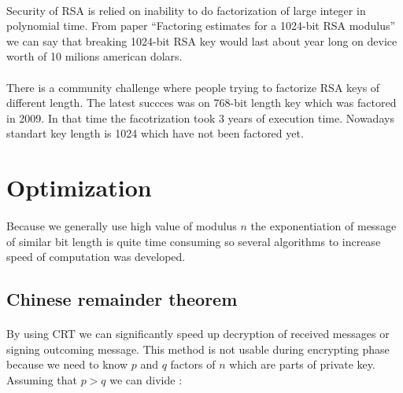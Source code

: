\documentclass[thesis=B,english]{FITthesis}[2012/10/20]
\begin{document}
\paragraph*{}{
Security of RSA is relied on inability to do factorization of large integer in polynomial time. From paper ``Factoring estimates for a 1024-bit RSA modulus''\cite{} we can say that breaking 1024-bit RSA key would last about year long on device worth of 10 milions american dolars.
}

\paragraph*{}{
There is a community challenge where people trying to factorize RSA keys of different length. The latest succces was on 768-bit length key which was factored in 2009. In that time the facotrization took 3 years of execution time. Nowadays standart key length is 1024 which have not been factored yet.
}


\section{Optimization}
\paragraph*{}
{Because we generally use high value of modulus \(n\) the exponentiation of message of similar bit length is quite time consuming so several algorithms to increase speed of computation was developed.}

\subsection{Chinese remainder theorem}

\paragraph*{}
{By using CRT we can significantly speed up decryption of received messages or signing outcoming message. This method is not usable during encrypting phase because we need to know \(p\) and \(q\) factors of \(n\) which are parts of private key.
Assuming that \(p>q\) we can divide :}
\end{document}
